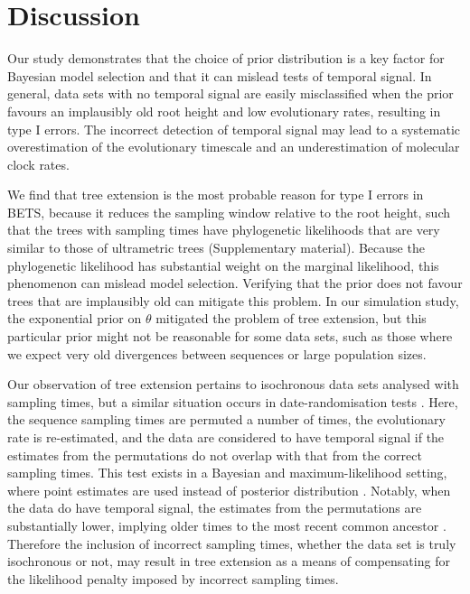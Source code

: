 \documentclass[10pt,letterpaper]{article}
\begin{document}
\section*{Discussion}
Our study demonstrates that the choice of prior distribution is a key factor for Bayesian model selection and that it can mislead tests of temporal signal. In general, data sets with no temporal signal are easily misclassified when the prior favours an implausibly old root height and low evolutionary rates, resulting in type I errors. The incorrect detection of temporal signal may lead to a systematic overestimation of the evolutionary timescale and an underestimation of molecular clock rates.

{We find that tree extension is the most probable reason for type I errors in BETS, because it reduces the sampling window relative to the root height, such that the trees with sampling times have phylogenetic likelihoods that are very similar to those of ultrametric trees (Supplementary material). Because the phylogenetic likelihood has substantial weight on the marginal likelihood, this phenomenon can mislead model selection. Verifying that the prior does not favour trees that are implausibly old can mitigate this problem. In our simulation study, the exponential prior on $\theta$ mitigated the problem of tree extension, but this particular prior might not be reasonable for some data sets, such as those where we expect very old divergences between sequences or large population sizes.}

Our observation of tree extension pertains to isochronous data sets analysed with sampling times, but a similar situation occurs in date-randomisation tests \cite{ramsden2009hantavirus}. {Here, the sequence sampling times are permuted a number of times, the evolutionary rate is re-estimated, and the data are considered to have temporal signal if the estimates from the permutations do not overlap with that from the correct sampling times. This test exists in a Bayesian and maximum-likelihood setting, where point estimates are used instead of posterior distribution \cite{duchene2018inferring}. Notably, when the data do have temporal signal, the estimates from the permutations are substantially lower, implying older times to the most recent common ancestor \cite{rieux2016inferences}. Therefore the inclusion of incorrect sampling times, whether the data set is truly isochronous or not, may result in tree extension as a means of compensating for the likelihood penalty imposed by incorrect sampling times.}
\end{document}
